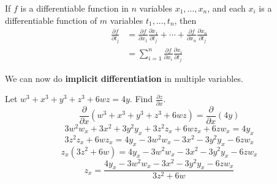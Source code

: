 \begin{theorem}
    If \(f\) is a differentiable function in \(n\) variables \(x_1,\ldots,x_n\), and each \(x_i\) is a differentiable function of \(m\) variables \(t_1,\ldots,t_n\), then 
    \begin{align*}
        \frac{\partial f}{\partial t_j}&=\frac{\partial f}{\partial x_1}\frac{\partial x_1}{\partial t_j}+\cdots+\frac{\partial f}{\partial x_n}\frac{\partial x_n}{\partial t_j}\\
        &=\sum_{i=1}^n \frac{\partial f}{\partial x_i}\frac{\partial x_i}{\partial t_j} 
\end{align*}
\end{theorem}
We can now do \textbf{implicit} \textbf{differentiation} in multiple variables.
\begin{eg}
    Let \(w^3 +x^3 +y^3 +z^3 +6wz=4y\). Find \(\frac{\partial z}{\partial x}\). 
    \[
        \frac{\partial }{\partial x}\left( w^3 +x^3 +y^3 +z^3 +6wz \right) =\frac{\partial }{\partial x}(4y)
    \]
    \[
        3w^2 w_x +3x^2 +3y^2 y_x +3z^2 z_x +6wz_x +6zw_x =4y_x
    \]
    \[
        3z^2 z_x +6wz_x=4y_x -3w^2 w_x -3x^2 -3y^2 y_x -6zw_x
    \]
    \[
        z_x(3z^2 +6w)=4y_x -3w^2 w_x -3x^2 -3y^2 y_x -6zw_x
    \]
    \[
        z_x =\frac{4y_x -3w^2 w_x -3x^2 -3y^2 y_x -6zw_x}{3z^2 +6w}
    \]
\end{eg}

